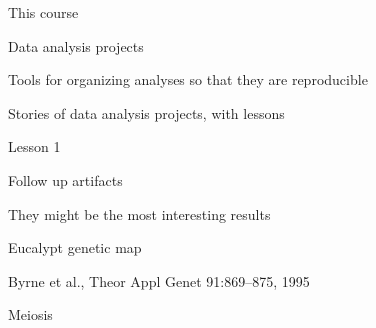 \documentclass[aspectratio=169,12pt,t]{beamer}
\begin{document}
\begin{frame}{This course}

\bbi
\item Data analysis projects

\item Tools for organizing analyses so that they are reproducible

\item Stories of data analysis projects, with lessons
\ei

\end{frame}



\begin{frame}[c]{Lesson 1}


\centerline{\Large Follow up artifacts}

\bigskip \bigskip

\centerline{\large \hilit They might be the most interesting results}


\end{frame}


\begin{frame}[c]{}


\end{frame}



\begin{frame}[c]{Eucalypt genetic map}


\vspace{5mm}

\hfill {\lolit \scriptsize
Byrne et al., Theor Appl Genet 91:869--875, 1995}

\end{frame}



\begin{frame}[c]{Meiosis}


\end{frame}
\end{document}
